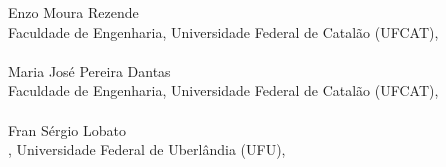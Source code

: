 \begin{center}
{\large Enzo Moura Rezende} \\
{\small
Faculdade de Engenharia, Universidade Federal de Catalão (UFCAT),  \\
} \\[1.2em]

{\large Maria José Pereira Dantas} \\
{\small
Faculdade de Engenharia, Universidade Federal de Catalão (UFCAT),  \\
} \\[1.2em]

{\large Fran Sérgio Lobato} \\
{\small
{}, Universidade Federal de Uberlândia (UFU),  \\
 \\
}
\end{center}
